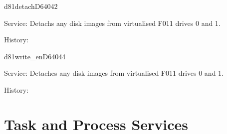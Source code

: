 \newpage
\begin{hyppotrap}{d81detach}{D640}{42}
\item [Service:]
  Detachs any disk images from virtualised F011 drives 0 and 1.
\item [History:]
\end{hyppotrap}


%
\newpage
\begin{hyppotrap}{d81write\_en}{D640}{44}
\item [Service:]
  Detaches any disk images from virtualised F011 drives 0 and 1.
\item [History:]
\end{hyppotrap}



\newpage
\section{Task and Process Services}



